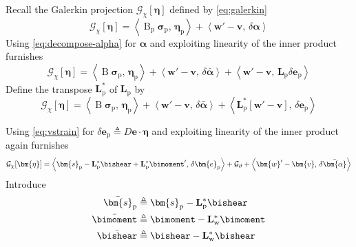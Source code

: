Recall the Galerkin projection \(\mathcal{G}_{\chi}[\bm{\eta}]\) defined by \eqref{eq:galerkin}
\begin{equation*}
\mathcal{G}_{\chi}[\bm{\eta}] = \left< \operatorname{B}_{\mathrm{p}} \bm{\sigma}_{\mathrm{p}} ,\, \bm{\eta}_{\mathrm{p}} \right>
+\left< \bm{w}'-\bm{v},\, \delta\bm{\alpha} \right>
\end{equation*}
Using \eqref{eq:decompose-alpha} for \(\bm{\alpha}\) and exploiting linearity of the inner product furnishes
\begin{equation*}
\mathcal{G}_{\chi}[\bm{\eta}] = \left< \operatorname{B} \bm{\sigma}_{\mathrm{p}} ,\, \bm{\eta}_{\mathrm{p}} \right>
+\left< \bm{w}'-\bm{v} ,\, \delta \bar{\bm{\alpha}} \right>
+\left< \bm{w}'-\bm{v} ,\, \mathbf{L}_{\mathrm{p}} \delta \bm{e}_{\mathrm{p}} \right>
\end{equation*}
Define the transpose \(\mathbf{L}_{\mathrm{p}}^*\) of \(\mathbf{L}_{\mathrm{p}}\) by
\begin{equation*}
\mathcal{G}_{\chi}[\bm{\eta}] = \left< \operatorname{B} \bm{\sigma}_{\mathrm{p}} ,\, \bm{\eta}_{\mathrm{p}} \right>
+\left< \bm{w}'-\bm{v} ,\, \delta \bar{\bm{\alpha}} \right>
+\left< \mathbf{L}_{\mathrm{p}}^* [\bm{w}'-\bm{v}] ,\, \delta \bm{e}_{\mathrm{p}} \right>
\end{equation*}

%
Using \eqref{eq:vstrain} for \(\delta \bm{e}_{\mathrm{p}}\triangleq D\bm{e}\cdot \bm{\eta}\) and exploiting linearity of the inner product again furnishes
\begin{equation*}
\mathcal{G}_{\chi}[\bm{\eta}] = 
\left<\bm{s}_{\mathrm{p}} - \mathbf{L}_{\mathrm{p}}^*\bishear + \mathbf{L}_{\mathrm{p}}^* \bimoment' ,\, \delta \bm{e}_{\mathrm{p}} \right>
+\mathcal{G}_{\partial}
+\left< \bm{w}'-\bm{v} ,\, \delta \bar{\bm{\alpha}} \right>
\end{equation*}
Introduce
\begin{equation}
\begin{aligned}
\bar{\bm{s}}_{\mathrm{p}} &\triangleq \bm{s}_{\mathrm{p}} - \mathbf{L}_{\mathrm{p}}^*\bishear \\
\bar{\bimoment} &\triangleq \bimoment - \mathbf{L}_{\mathrm{w}}^* \bimoment \\
\bar{\bishear} &\triangleq \bishear - \mathbf{L}_{\mathrm{w}}^* \bishear 
\end{aligned}
\label{eq:augment-stress}
\end{equation}

